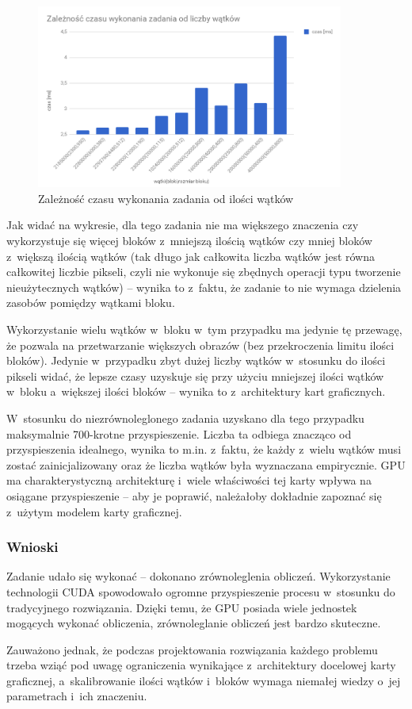\documentclass[a4paper,12pt]{article}
\begin{document}
\begin{figure}[!hbtp]
 \centering
  \includegraphics[width=0.9\textwidth]{wykres.png}
  \caption{Zależność czasu wykonania zadania od ilości wątków}
\end{figure}
Jak widać na wykresie, dla tego zadania nie ma większego znaczenia czy wykorzystuje się więcej bloków z~mniejszą ilością wątków czy mniej bloków z~większą ilością wątków (tak długo jak całkowita liczba wątków jest równa całkowitej liczbie pikseli, czyli nie wykonuje się zbędnych operacji typu tworzenie nieużytecznych wątków) -- wynika to z~faktu, że zadanie to nie wymaga dzielenia zasobów pomiędzy wątkami bloku.

Wykorzystanie wielu wątków w~bloku w~tym przypadku ma jedynie tę przewagę, że pozwala na przetwarzanie większych obrazów (bez przekroczenia limitu ilości bloków). Jedynie w~przypadku zbyt dużej liczby wątków w~stosunku do ilości pikseli widać, że lepsze czasy uzyskuje się przy użyciu mniejszej ilości wątków w~bloku a~większej ilości bloków -- wynika to z~architektury kart graficznych.

W~stosunku do niezrównoleglonego zadania uzyskano dla tego przypadku maksymalnie 700-krotne przyspieszenie. Liczba ta odbiega znacząco od przyspieszenia idealnego, wynika to m.in. z~faktu, że każdy z~wielu wątków musi zostać zainicjalizowany oraz że liczba wątków była wyznaczana empirycznie. GPU ma charakterystyczną architekturę i~wiele właściwości tej karty wpływa na osiągane przyspieszenie -- aby je poprawić, należałoby dokładnie zapoznać się z~użytym modelem karty graficznej.

\subsubsection*{Wnioski }
Zadanie udało się wykonać -- dokonano zrównoleglenia obliczeń. Wykorzystanie technologii CUDA spowodowało ogromne przyspieszenie procesu w~stosunku do tradycyjnego rozwiązania. Dzięki temu, że GPU posiada wiele jednostek mogących wykonać obliczenia, zrównoleglanie obliczeń jest bardzo skuteczne.

Zauważono jednak, że podczas projektowania rozwiązania każdego problemu trzeba wziąć pod uwagę ograniczenia wynikające z~architektury docelowej karty graficznej, a~skalibrowanie ilości wątków i~bloków wymaga niemałej wiedzy o~jej parametrach i~ich znaczeniu.
\end{document}
